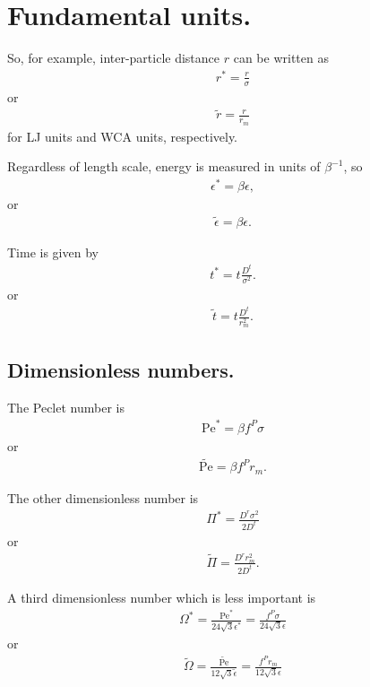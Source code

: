 \documentclass[twocolumn,amsmath,amssymb,aps]{revtex4-1}%
\begin{document}
\section{Fundamental units.}
So, for example, inter-particle distance $r$ can be written as
\begin{align}
  r^* = \frac{r}{\sigma}
\end{align}
or
\begin{align}
  \tilde{r} = \frac{r}{r_m}
\end{align}
for LJ units and WCA units, respectively.


Regardless of length scale, energy is measured in units of
$\beta^{-1}$, so
\begin{align}
  \epsilon^* = \beta\epsilon,
\end{align}
or
\begin{align}
  \tilde{\epsilon} = \beta\epsilon.
\end{align}


Time is given by
\begin{align}
  t^* = t\frac{D^t}{\sigma^2}.
\end{align}
or
\begin{align}
  \tilde{t} = t\frac{D^t}{r_m^2}.
\end{align}

\subsection{Dimensionless numbers.}

The Peclet number is
\begin{align}
  \mathrm{Pe}^* = \beta f^P \sigma
\end{align}
or
\begin{align}
  \tilde{\mathrm{Pe}} = \beta f^P r_m.
\end{align}

The other dimensionless number is
\begin{align}
  \Pi^* = \frac{D^r\sigma^2}{2D^t}
\end{align}
or
\begin{align}
  \tilde{\Pi} = \frac{D^rr_m^2}{2D^t}.
\end{align}

A third dimensionless number which is less important is
\begin{align}
  \Omega^*
  = \frac{\mathrm{Pe}^*}{24\sqrt{3}\epsilon^*}
  = \frac{f^P \sigma}{24\sqrt{3}\epsilon}
\end{align}
or
\begin{align}
  \tilde{\Omega}
  = \frac{\tilde{\mathrm{Pe}}}{12\sqrt{3}\tilde{\epsilon}}
  = \frac{f^P r_m}{12\sqrt{3}\epsilon}
\end{align}
\end{document}
